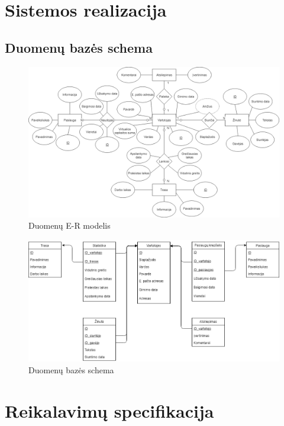 \documentclass[oneside]{VUMIFPSkursinis}
\begin{document}
\section{Sistemos realizacija}
	\subsection{Duomenų bazės schema}
			\begin{figure}[h]
    				\centering
    				\includegraphics[width=1\textwidth]{Database2.png}
    				\caption{Duomenų E-R modelis}
			\end{figure}
			
			\begin{figure}[h]
    				\centering
    				\includegraphics[width=1\textwidth]{Database_2.png}
    				\caption{Duomenų bazės schema}
			\end{figure}
		

\section{Reikalavimų specifikacija}
\end{document}
